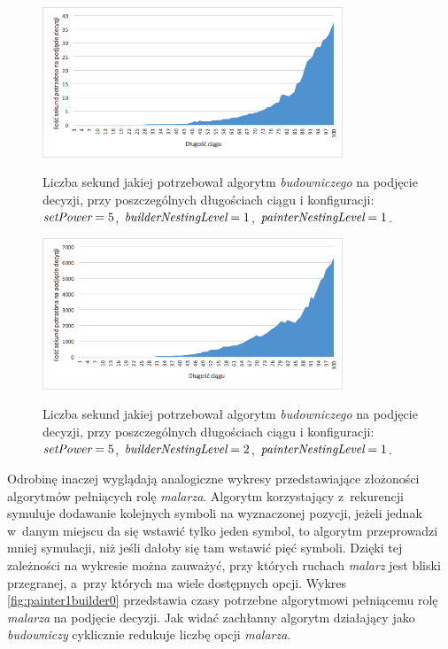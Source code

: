 \documentclass[document]{xmgr}
\begin{document}
\begin{figure}[tbh]
    \centering
    \caption{Liczba sekund jakiej potrzebował algorytm \emph{budowniczego} na podjęcie decyzji, przy poszczególnych długościach ciągu i konfiguracji: $\emph{setPower}=5$, $\emph{builderNestingLevel}=1$, $\emph{painterNestingLevel}=1$.}
    \includegraphics[width = 0.8\textwidth]{images2/timeBuilder1Painter1}
    \label{fig:builder1painter1}
\end{figure}

\begin{figure}[tbh]
    \centering
    \caption{Liczba sekund jakiej potrzebował algorytm \emph{budowniczego} na podjęcie decyzji, przy poszczególnych długościach ciągu i konfiguracji: $\emph{setPower}=5$, $\emph{builderNestingLevel}=2$, $\emph{painterNestingLevel}=1$.}
    \includegraphics[width = 0.8\textwidth]{images2/timeBuilder2Painter1}
    \label{fig:builder2painter1}
\end{figure}



Odrobinę inaczej wyglądają analogiczne wykresy przedstawiające złożoności algorytmów pełniących rolę \emph{malarza}. Algorytm korzystający z~rekurencji symuluje dodawanie kolejnych symboli na wyznaczonej pozycji, jeżeli jednak w~danym miejscu da się wstawić tylko jeden symbol, to algorytm przeprowadzi mniej symulacji, niż jeśli dałoby się tam wstawić pięć symboli. Dzięki tej zależności na wykresie można zauważyć, przy których ruchach \emph{malarz} jest bliski przegranej, a~przy których ma wiele dostępnych opcji. Wykres \ref{fig:painter1builder0} przedstawia czasy potrzebne algorytmowi pełniącemu rolę \emph{malarza} na podjęcie decyzji. Jak widać zachłanny algorytm działający jako \emph{budowniczy} cyklicznie redukuje liczbę opcji \emph{malarza}.
\end{document}
